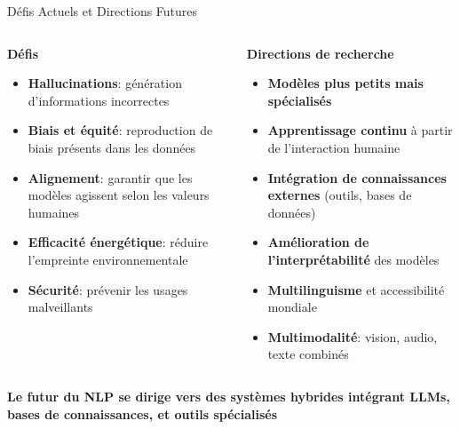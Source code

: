 \documentclass[aspectratio=169,11pt]{beamer}
\begin{document}
\begin{frame}{Défis Actuels et Directions Futures}
    \begin{columns}
        \begin{column}{0.48\textwidth}
            \textbf{Défis}
            \begin{itemize}
                \item \textbf{Hallucinations}: génération d'informations incorrectes
                \item \textbf{Biais et équité}: reproduction de biais présents dans les données
                \item \textbf{Alignement}: garantir que les modèles agissent selon les valeurs humaines
                \item \textbf{Efficacité énergétique}: réduire l'empreinte environnementale
                \item \textbf{Sécurité}: prévenir les usages malveillants
            \end{itemize}
        \end{column}
        \begin{column}{0.52\textwidth}
            \textbf{Directions de recherche}
            \begin{itemize}
                \item \textbf{Modèles plus petits mais spécialisés}
                \item \textbf{Apprentissage continu} à partir de l'interaction humaine
                \item \textbf{Intégration de connaissances externes} (outils, bases de données)
                \item \textbf{Amélioration de l'interprétabilité} des modèles
                \item \textbf{Multilinguisme} et accessibilité mondiale
                \item \textbf{Multimodalité}: vision, audio, texte combinés
            \end{itemize}
        \end{column}
    \end{columns}
    \vspace{0.3cm}
    \begin{center}
        \textbf{Le futur du NLP se dirige vers des systèmes hybrides intégrant LLMs, bases de connaissances, et outils spécialisés}
    \end{center}
\end{frame}
\end{document}

